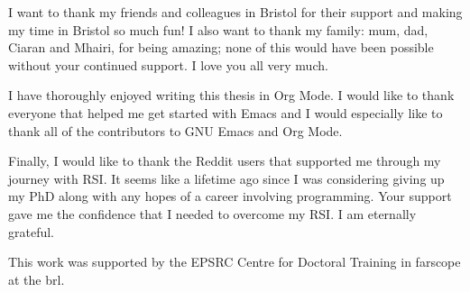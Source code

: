 \documentclass{mimosis-class/mimosis}
\numberwithin{equation}{chapter}
\begin{document}
\begin{singlespace}




I want to thank my friends and colleagues in Bristol for their support and making my time in Bristol so much fun!
I also want to thank my family: mum, dad, Ciaran and Mhairi, for being amazing;
none of this would have been possible without your continued support.
I love you all very much.

I have thoroughly enjoyed writing this thesis in Org Mode.
I would like to thank everyone that helped me get started with Emacs and
I would especially like to thank all of the contributors to GNU Emacs and Org Mode.

Finally, I would like to thank the Reddit users that supported me through my journey with RSI.
It seems like a lifetime ago since I was considering giving up my PhD along with any hopes of a career
involving programming.
Your support gave me the confidence that I needed to overcome my RSI. I am eternally grateful.


This work was supported by the EPSRC Centre for Doctoral Training in \acrfull{farscope} at the \acrfull{brl}.

\end{singlespace}
\tableofcontents
%
\listoftables
%
\listoffigures

\printglossary[type=\acronymtype]
\end{document}
